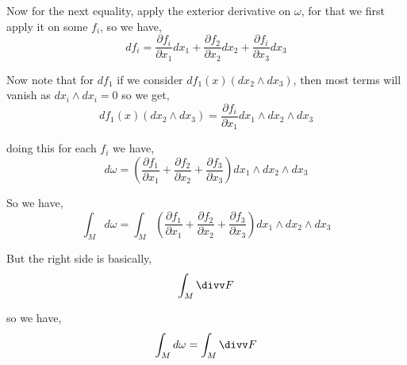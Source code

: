 \documentclass[a4paper]{article}
\begin{document}


Now for the next equality,  apply the exterior derivative on $\omega$, for that we first apply it on some $f_i$, so we have, 
\[
  df_i = \frac{\partial f_i}{\partial x_1} dx_1 + \frac{\partial f_2}{\partial x_2} dx_2 + \frac{\partial f_i}{\partial x_3} dx_3
\]

Now note that for $df_{1}$ if we consider $df_{1}(x) (dx_{2} \wedge dx_{3})$, then most terms will vanish as $dx_i \wedge dx_i = 0$ so we get, 
\[
  df_{1}(x) (dx_{2} \wedge dx_{3}) =  \frac{\partial f_i}{\partial x_1} dx_1 \wedge dx_{2} \wedge dx_{3}
\]

doing this for each $f_i$ we have, 
\[
 d \omega = \left ( \frac{\partial f_1}{\partial x_{1}} + \frac{\partial f_2}{\partial x_{2}} + \frac{\partial f_3}{\partial x_{3}}\right ) dx_{1} \wedge dx_{2} \wedge dx_{3}
\]

So we have, 
\[
  \int_{M}^{} d\omega = \int_{M}^{}  \left ( \frac{\partial f_1}{\partial x_{1}} + \frac{\partial f_2}{\partial x_{2}} + \frac{\partial f_3}{\partial x_{3}}\right ) dx_{1} \wedge dx_{2} \wedge dx_{3}
\]

But the right side is basically, 
\[
  \int_{M}^{} \divv F
\]

so we have, 
\[
  \int_{M}^{} d\omega = \int_{M}^{} \divv F
\]
\end{document}

